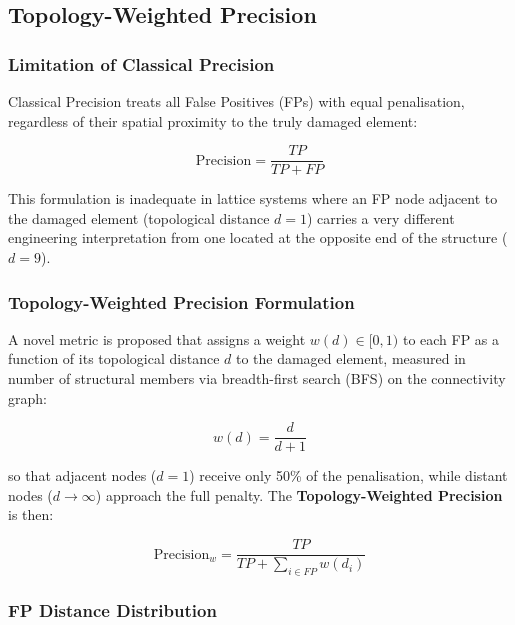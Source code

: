 \documentclass[preprint,12pt]{elsarticle}
\begin{document}
\subsection{Topology-Weighted Precision}
\label{subsec:precision_ponderada}

\subsubsection{Limitation of Classical Precision}

Classical Precision treats all False Positives (FPs) with equal penalisation,
regardless of their spatial proximity to the truly damaged element:

\begin{equation}
    \label{eq:precision_clasica}
    \text{Precision} = \frac{TP}{TP + FP}
\end{equation}

This formulation is inadequate in lattice systems where an FP node adjacent
to the damaged element (topological distance $d=1$) carries a very different engineering
interpretation from one located at the opposite end of the structure ($d = 9$).

\subsubsection{Topology-Weighted Precision Formulation}

A novel metric is proposed that assigns a weight $w(d) \in [0, 1)$ to each FP as a function
of its topological distance $d$ to the damaged element, measured in number of structural
members via breadth-first search (BFS) on the connectivity graph:

\begin{equation}
    \label{eq:weight_fn}
    w(d) = \frac{d}{d + 1}
\end{equation}

so that adjacent nodes ($d=1$) receive only 50\% of the penalisation, while
distant nodes ($d \to \infty$) approach the full penalty. The \textbf{Topology-Weighted
Precision} is then:

\begin{equation}
    \label{eq:precision_ponderada}
    \text{Precision}_w = \frac{TP}{TP + \displaystyle\sum_{i \in FP} w(d_i)}
\end{equation}

\subsubsection{FP Distance Distribution}
\end{document}
